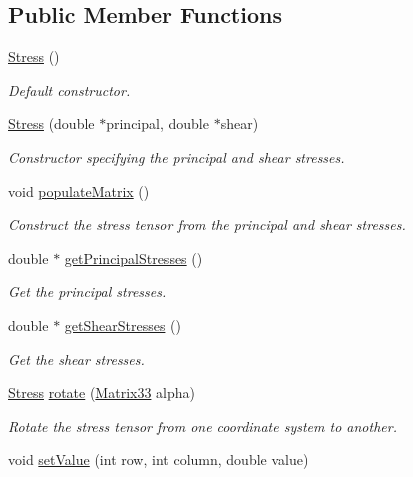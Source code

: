 \subsection*{Public Member Functions}
\begin{DoxyCompactItemize}
\item 
\hyperlink{classStress_aa01e83a3f6791cbadc5a368e3a40515e}{Stress} ()
\begin{DoxyCompactList}\small\item\em Default constructor. \end{DoxyCompactList}\item 
\hyperlink{classStress_ae4e2f6250e3bdd4d3d78a9c6bdde7bab}{Stress} (double $\ast$principal, double $\ast$shear)
\begin{DoxyCompactList}\small\item\em Constructor specifying the principal and shear stresses. \end{DoxyCompactList}\item 
void \hyperlink{classStress_aa395d5763df8feb4689e0c5524c9e562}{populate\-Matrix} ()
\begin{DoxyCompactList}\small\item\em Construct the stress tensor from the principal and shear stresses. \end{DoxyCompactList}\item 
double $\ast$ \hyperlink{classStress_aca57d2719f43701dd2ebf2ab00afa539}{get\-Principal\-Stresses} ()
\begin{DoxyCompactList}\small\item\em Get the principal stresses. \end{DoxyCompactList}\item 
double $\ast$ \hyperlink{classStress_afe8214b8e9061930e6598e1970fd61f5}{get\-Shear\-Stresses} ()
\begin{DoxyCompactList}\small\item\em Get the shear stresses. \end{DoxyCompactList}\item 
\hyperlink{classStress}{Stress} \hyperlink{classStress_a61fa75450c0232bb0fa427072d1b6a35}{rotate} (\hyperlink{classMatrix33}{Matrix33} alpha)
\begin{DoxyCompactList}\small\item\em Rotate the stress tensor from one coordinate system to another. \end{DoxyCompactList}\item 
void \hyperlink{classMatrix33_a6cdcec77fd089b2e73ad7ae85ecff30b}{set\-Value} (int row, int column, double value)

\end{DoxyCompactItemize}
